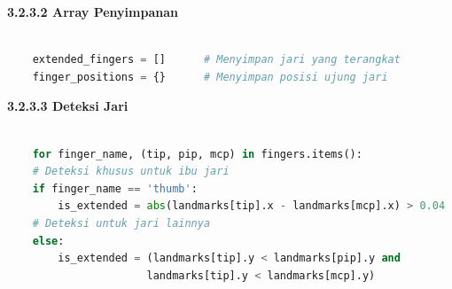 \documentclass[11pt,a4paper]{article}
\begin{document}
    \noindent\textbf{3.2.3.2 Array Penyimpanan}
    \begin{lstlisting}[language=Python, caption=Array Penyimpanan]
        
    extended_fingers = []      # Menyimpan jari yang terangkat
    finger_positions = {}      # Menyimpan posisi ujung jari
    \end{lstlisting}

    \noindent\textbf{3.2.3.3 Deteksi Jari}
    \begin{lstlisting}[language=Python, caption=Deteksi Jari]
        
    for finger_name, (tip, pip, mcp) in fingers.items():
    # Deteksi khusus untuk ibu jari
    if finger_name == 'thumb':
        is_extended = abs(landmarks[tip].x - landmarks[mcp].x) > 0.04
    # Deteksi untuk jari lainnya
    else:
        is_extended = (landmarks[tip].y < landmarks[pip].y and 
                      landmarks[tip].y < landmarks[mcp].y)
    \end{lstlisting}
\end{document}
